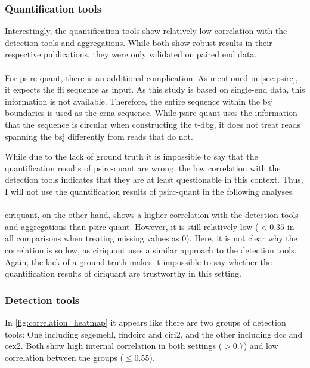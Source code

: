 \subsubsection{Quantification tools}
Interestingly, the quantification tools show relatively low correlation with
the detection tools and aggregations.
While both show robust results in their respective publications, they were only
validated on paired end
data\supercite{zhang_accurate_2020,yu_quantifying_2021}.

\paragraph{}
For \gls{psirc-quant}, there is an additional complication: As mentioned in
\cref{sec:psirc}, it expects the \gls{fli} sequence as input.
As this study is based on single-end data, this information is not available.
Therefore, the entire sequence within the \gls{bsj} boundaries is used as the
\gls{crna} sequence.
While \gls{psirc-quant} uses the information that the sequence is circular when
constructing the \gls{t-dbg}, it does not treat reads spanning the \gls{bsj}
differently from reads that do not\supercite{yu_quantifying_2021}.

While due to the lack of ground truth it is impossible to say that the
quantification results of \gls{psirc-quant} are wrong, the low correlation with
the detection tools indicates that they are at least questionable in this
context.
Thus, I will not use the quantification results of \gls{psirc-quant} in the
following analyses.

\paragraph{}
\Gls{ciriquant}, on the other hand, shows a higher correlation with
the detection tools and aggregations than \gls{psirc-quant}.
However, it is still relatively low ($<0.35$ in all comparisons when treating
missing values as 0).
Here, it is not clear why the correlation is so low, as \gls{ciriquant} uses a
similar approach to the detection tools.
Again, the lack of a ground truth makes it impossible to say whether the
quantification results of \gls{ciriquant} are trustworthy in this setting.

\subsubsection{Detection tools}
In \cref{fig:correlation_heatmap} it appears like there are two groups of
detection tools: One including \gls{segemehl}, \gls{findcirc} and \gls{ciri2},
and the other including \gls{dcc} and \gls{cex2}.
Both show high internal correlation in both settings ($>0.7$) and low
correlation between the groups ($\leq0.55$).

